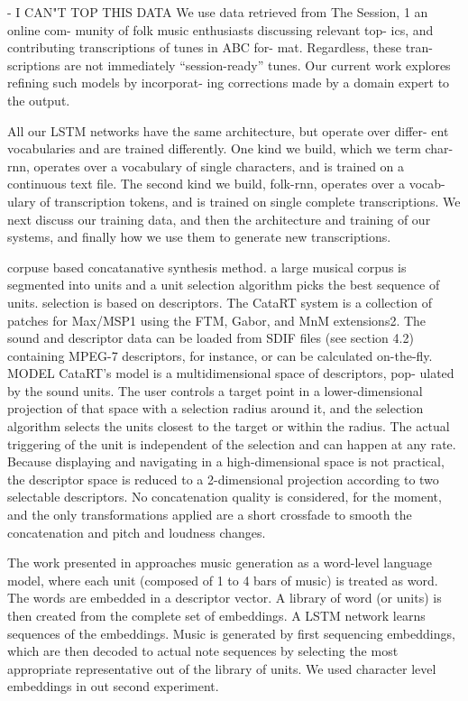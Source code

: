 - I CAN"T TOP THIS DATA
We use data retrieved from The Session, 1 an online com- munity of folk music enthusiasts discussing relevant top- ics, and contributing transcriptions of tunes in ABC for- mat.
Regardless, these tran- scriptions are not immediately “session-ready” tunes. Our current work explores refining such models by incorporat- ing corrections made by a domain expert to the output.

\cite{Sturm2016} All our LSTM networks have the same architecture, but operate over differ- ent vocabularies and are trained differently. One kind we build, which we term char-rnn, operates over a vocabulary of single characters, and is trained on a continuous text file. The second kind we build, folk-rnn, operates over a vocab- ulary of transcription tokens, and is trained on single complete transcriptions. We next discuss our training data, and then the architecture and training of our systems, and finally how we use them to generate new transcriptions. 

\cite{Schwarz2006} corpuse based concatanative synthesis method. a large musical corpus is segmented into units and a unit selection algorithm picks the best sequence of units. selection is based on descriptors. The CataRT system is a collection of patches for Max/MSP1 using the FTM, Gabor, and MnM extensions2. The sound and descriptor data can be loaded from SDIF files (see section 4.2) containing MPEG-7 descriptors, for instance, or can be calculated on-the-fly. MODEL CataRT’s model is a multidimensional space of descriptors, pop- ulated by the sound units. The user controls a target point in a lower-dimensional projection of that space with a selection radius around it, and the selection algorithm selects the units closest to the target or within the radius. The actual triggering of the unit is independent of the selection and can happen at any rate. Because displaying and navigating in a high-dimensional space is not practical, the descriptor space is reduced to a 2-dimensional projection according to two selectable descriptors. No concatenation quality is considered, for the moment, and the only transformations applied are a short crossfade to smooth the concatenation and pitch and loudness changes. 

\cite{Bretan2016}
The work presented in \cite{Bretan2016} approaches music generation as a word-level language model, where each unit (composed of 1 to 4 bars of music) is treated as word. The words are embedded in a descriptor vector. A library of word (or units) is then created from the complete set of embeddings. A LSTM network learns sequences of the embeddings. Music is generated by first sequencing embeddings, which are then decoded to actual note sequences by selecting the most appropriate representative out of the library of units. We used character level embeddings in out second experiment.

